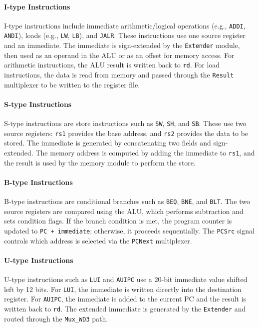 \documentclass[12pt]{report}
\begin{document}
\paragraph{I-type Instructions}
I-type instructions include immediate arithmetic/logical operations (e.g., \texttt{ADDI}, \texttt{ANDI}), loads (e.g., \texttt{LW}, \texttt{LB}), and \texttt{JALR}. These instructions use one source register and an immediate. The immediate is sign-extended by the \texttt{Extender} module, then used as an operand in the ALU or as an offset for memory access. For arithmetic instructions, the ALU result is written back to \texttt{rd}. For load instructions, the data is read from memory and passed through the \texttt{Result} multiplexer to be written to the register file.

\paragraph{S-type Instructions}
S-type instructions are store instructions such as \texttt{SW}, \texttt{SH}, and \texttt{SB}. These use two source registers: \texttt{rs1} provides the base address, and \texttt{rs2} provides the data to be stored. The immediate is generated by concatenating two fields and sign-extended. The memory address is computed by adding the immediate to \texttt{rs1}, and the result is used by the memory module to perform the store.

\paragraph{B-type Instructions}
B-type instructions are conditional branches such as \texttt{BEQ}, \texttt{BNE}, and \texttt{BLT}. The two source registers are compared using the ALU, which performs subtraction and sets condition flags. If the branch condition is met, the program counter is updated to \texttt{PC + immediate}; otherwise, it proceeds sequentially. The \texttt{PCSrc} signal controls which address is selected via the \texttt{PCNext} multiplexer.

\paragraph{U-type Instructions}
U-type instructions such as \texttt{LUI} and \texttt{AUIPC} use a 20-bit immediate value shifted left by 12 bits. For \texttt{LUI}, the immediate is written directly into the destination register. For \texttt{AUIPC}, the immediate is added to the current PC and the result is written back to \texttt{rd}. The extended immediate is generated by the \texttt{Extender} and routed through the \texttt{Mux\_WD3} path.
\end{document}
